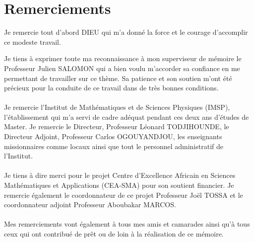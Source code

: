 \chapter*{Remerciements}
\begin{flushleft}
Je remercie tout d'abord DIEU qui m'a donné la force et le courage d'accomplir ce modeste travail.
\end{flushleft}
\[\]
Je tiens à exprimer toute ma reconnaissance à mon superviseur de mémoire le Professeur Julien SALOMON qui a bien voulu m'accorder sa confiance en me permettant de travailler sur ce thème. Sa patience et son soutien m'ont été précieux pour la conduite de ce travail dans de très bonnes conditions.\\\\
Je remercie l'Institut de Mathématiques et de Sciences Physiques (IMSP), l'établissement qui m'a servi de cadre adéquat pendant ces deux ans d'études de Master. Je remercie le Directeur, Professeur Léonard TODJIHOUNDE, le Directeur Adjoint, Professeur Carlos OGOUYANDJOU, les enseignants missionnaires comme locaux ainsi que tout le personnel administratif de l'Institut.\\\\
Je tiens à dire merci pour le projet Centre d'Excellence Africain en Sciences Mathématiques et Applications (CEA-SMA) pour son soutient financier. Je remercie également le coordonnateur de ce projet Professeur Joël TOSSA et le coordonnateur adjoint Professeur Aboubakar MARCOS.\\\\
Mes remerciements vont également à tous mes amis et camarades ainsi qu'à tous ceux qui ont contribué de prêt ou de loin à la réalisation de ce mémoire.\\\\\\
